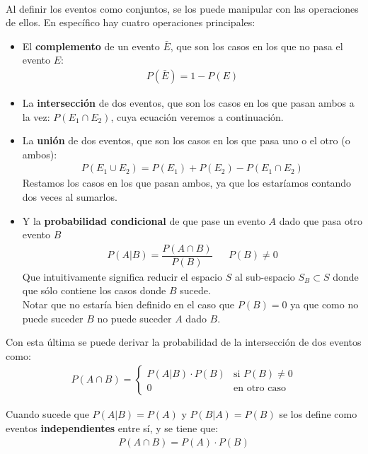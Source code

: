 \documentclass[../main.tex]{subfiles}
\begin{document}
\paragraph{} Al definir los eventos como conjuntos, se los puede manipular con las operaciones de ellos. En específico hay cuatro operaciones principales:
\begin{itemize}
  \item El \textbf{complemento} de un evento \(\bar{E}\), que son los casos en los que no pasa el evento \(E\):
    \begin{gather*}
      P(\bar{E}) = 1 - P(E)
    \end{gather*}
  \item La \textbf{intersección} de dos eventos, que son los casos en los que pasan ambos a la vez: \(P(E_{1} \cap E_{2})\), cuya ecuación veremos a continuación.
  \item La \textbf{unión} de dos eventos, que son los casos en los que pasa uno o el otro (o ambos):
    \begin{gather*}
      P(E_{1} \cup E_{2}) = P(E_{1}) + P(E_{2}) - P(E_{1} \cap E_{2})
    \end{gather*}
    Restamos los casos en los que pasan ambos, ya que los estaríamos contando dos veces al sumarlos.
  \item Y la \textbf{probabilidad condicional} de que pase un evento \(A\) dado que pasa otro evento \(B\)
    \begin{align*}
      P(A | B) = \dfrac{P(A \cap B)}{P(B)} && P(B) \neq 0
    \end{align*}
    Que intuitivamente significa reducir el espacio \(S\) al sub-espacio \(S_{B} \subset S\) donde que sólo contiene los casos donde \(B\) sucede. \\
    Notar que no estaría bien definido en el caso que \(P(B) = 0\) ya que como no puede suceder \(B\) no puede suceder \(A\) dado \(B\).
\end{itemize}

Con esta última se puede derivar la probabilidad de la intersección de dos eventos como: 
\begin{gather*}
  P(A \cap B) = \begin{cases} P(A | B) \cdot P(B) & \text{si } P(B) \neq 0 \\ 0 & \text{en otro caso} \end{cases}
\end{gather*}

Cuando sucede que \(P(A|B) = P(A)\) y \(P(B|A) = P(B)\) se los define como eventos \textbf{independientes} entre sí, y se tiene que:
\begin{gather*}
  P(A \cap B) = P(A) \cdot P(B)
\end{gather*}
\end{document}
